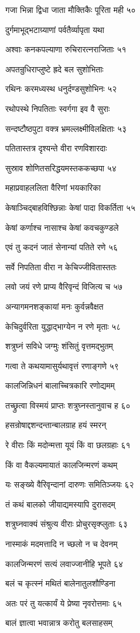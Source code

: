 गजा भिन्ना द्विधा जाता मौक्तिकैः पूरिता मही ५०

दुर्गमाभूद्भटाग्र्याणां पर्वतैर्व्यापृता यथा

अश्वाः कनकपल्याणा रुचिरारत्नराजिताः ५१

अपतन्रुधिराप्लुष्टे ह्रदे बल सुशोभिताः

रथिनः करमध्यस्थ धनुर्दण्डसुशोभिनः ५२

रथोपस्थे निपतिताः स्वर्गगा इव वै सुराः

सन्दष्टौष्ठपुटा वक्त्र भ्रमल्लक्ष्मीविलक्षिताः ५३

पतितास्तत्र दृश्यन्ते वीरा रणविशारदाः

सुस्राव शोणितसरिद्धयमस्तककच्छपा ५४

महाप्रवाहललिता वैरिणां भयकारिका

केषाञ्चिद्बाहविश्छिन्नाः केषां पादा विकर्तिता ५५

केषां कर्णाश्च नासाश्च केषां कवचकुण्डले

एवं तु कदनं जातं सेनान्यां पतिते रणे ५६

सर्वे निपतिता वीरा न केचिज्जीवितास्ततः

लवो जयं रणे प्राप्य वैरिवृन्दं विजित्य च ५७

अन्यागमनशङ्कायां मनः कुर्वन्नवैक्षत

केचिदुर्वरिता युद्धाद्भाग्येन न रणे मृताः ५८

शत्रुघ्नं सविधे जग्मुः शंसितुं वृत्तमद्भुतम्

गत्वा ते कथयामासुर्यथावृत्तं रणाङ्गणे ५९

कालजिन्निधनं बालाच्चित्रकारि रणोद्यमम्

तच्छ्रुत्वा विस्मयं प्राप्तः शत्रुघ्नस्तानुवाच ह ६०

हसन्रोषाद्दशन्दन्तान्बालग्राह हयं स्मरन्

रे वीराः किं मदोन्मत्ता यूयं किं वा छलग्रहाः ६१

किं वा वैकल्यमायातं कालजिन्मरणं कथम्

यः सङ्ख्ये वैरिवृन्दानां दारुणः समितिञ्जयः ६२

तं कथं बालको जीयाद्यमस्यापि दुरासदम्

शत्रुघ्नवाक्यं संश्रुत्य वीराः प्रोचुरसृक्प्लुताः ६३

नास्माकं मदमत्तादि न च्छलो न च देवनम्

कालजिन्मरणं सत्यं लवाज्जानीहि भूपते ६४

बलं च कृत्स्नं मथितं बालेनातुलशौण्डिना

अतः परं तु यत्कार्यं ये प्रेष्या नृवरोत्तमाः ६५

बालं ज्ञात्वा भवान्नात्र करोतु बलसाहसम्

